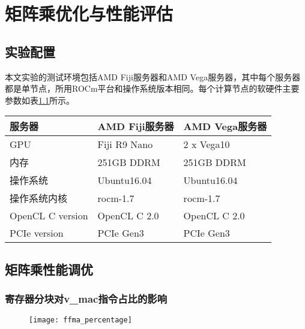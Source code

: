 \chapter{矩阵乘优化与性能评估}\label{chap:GEMMOpt}

\section{实验配置}

本文实验的测试环境包括AMD Fiji服务器和AMD Vega服务器，其中每个服务器都是单节点，所用ROCm平台和操作系统版本相同。每个计算节点的软硬件主要参数如表\ref{tab:hardwareplatform}所示。
\begin{table}[htbp]
	\label{tab:hardwareplatform}
	\begin{center}
		\begin{tabular}{ | l | p{6cm} | p{6cm} |}
			\hline
			服务器 & AMD Fiji服务器 & AMD Vega服务器 \\ \hline
			GPU & Fiji R9 Nano & 2 x Vega10 \\ \hline
			内存 & 251GB DDRM & 251GB DDRM \\ \hline
			操作系统 & Ubuntu16.04 & Ubuntu16.04 \\ \hline
			操作系统内核 & rocm-1.7 & rocm-1.7 \\ \hline
			OpenCL C version & OpenCL C 2.0 & OpenCL C 2.0 \\ \hline
			PCIe version & PCIe Gen3 & PCIe Gen3 \\
			\hline
		\end{tabular}
	\end{center}	
\end{table}


\section{矩阵乘性能调优}

\subsection{寄存器分块对v\_mac指令占比的影响}
\begin{figure}[htbp]
	\centering
	\texttt{[image: ffma\_percentage]}
	\label{fig:ffma_percentage}
\end{figure}

